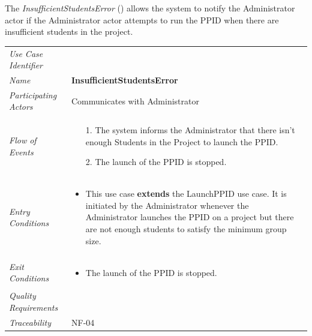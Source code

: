\documentclass[12pt,letterpaper]{article}
\begin{document}
\newpage{}

The {\it InsufficientStudentsError} ({\bf \insufficientstudentserror{}}) allows the system to notify the Administrator actor if the Administrator actor attempts to run the PPID when there are
insufficient students in the project.

\begin{center}
	\begin{tabu} to 
		\toprule
		Use Case Identifier & \insufficientstudentserror{} \\
		Name & {\bf InsufficientStudentsError} \\
		Participating Actors & Communicates with Administrator \\
		Flow of Events & 
		\begin{minipage}[t]{\linewidth}
		    \begin{enumerate}
			    \item[1.] The system informs the Administrator that there isn't enough Students in the Project to launch the PPID.
			    \item[2.] The launch of the PPID is stopped.
			\end{enumerate}
	    \end{minipage} \\

		Entry Conditions &
		\begin{minipage}[t]{\linewidth}
			\begin{itemize}
			    \item This use case \textbf{extends} the LaunchPPID use case. It is initiated by the Administrator whenever the Administrator launches the PPID on a project but there are not enough students to satisfy the minimum group size.
	        \end{itemize}
	    \end{minipage} \\

		Exit Conditions &
		\begin{minipage}[t]{\linewidth}
			\begin{itemize}
			    \item The launch of the PPID is stopped.
	        \end{itemize}
	    \end{minipage} \\

		Quality Requirements & \\

		Traceability & NF-04 \\
		\toprule
	\end{tabu}
\end{center}
\end{document}
